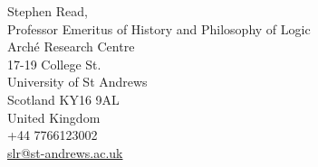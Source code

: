 Stephen   Read,   
\\Professor   Emeritus   of   History   and Philosophy of Logic 
\\Arché Research Centre
\\17-19 College St.
\\University of St Andrews 
\\Scotland KY16 9AL 
\\United Kingdom
\\+44 7766123002
\\ \href{mailto:slr@st-andrews.ac.uk}{slr@st-andrews.ac.uk}